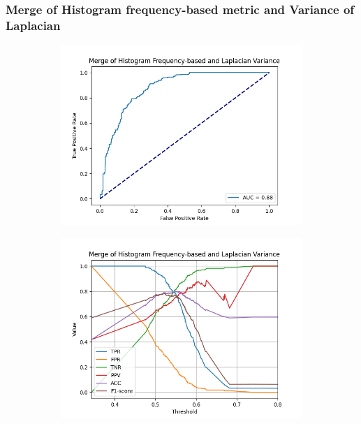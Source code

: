 \subsubsection{Merge of Histogram frequency-based metric and Variance of Laplacian}
\begin{figure}[H]
    \centering
    \begin{subfigure}[t]{0.48\textwidth}
        \includegraphics[width=\textwidth]{Figures/BlurredImages/results_on_thresholds/output_roc_hf_lv.png}
        \caption{}
        \label{fig:HF_LV_roc}
    \end{subfigure}\hspace{1em}
    \begin{subfigure}[t]{0.48\textwidth}
        \includegraphics[width=\textwidth]{Figures/BlurredImages/results_on_thresholds/threshold_test_scores_hf_lv.png}

\end{subfigure}
\end{figure}
